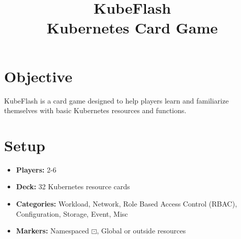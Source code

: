 \documentclass{article}
\title{KubeFlash \\ \large Kubernetes Card Game}
\author{}
\date{}
\begin{document}
\maketitle

\section*{Objective}
KubeFlash is a card game designed to help players learn and familiarize themselves with basic Kubernetes resources and functions.

\section*{Setup}
\begin{itemize}
    \item \textbf{Players:} 2-6
    \item \textbf{Deck:} 32 Kubernetes resource cards
    \item \textbf{Categories:} Workload, Network, Role Based Access Control (RBAC), Configuration, Storage, Event, Misc
    \item \textbf{Markers:} Namespaced {\LARGE$\boxdot$}, Global {\Mundus} or outside {} resources
\end{itemize}
\end{document}
